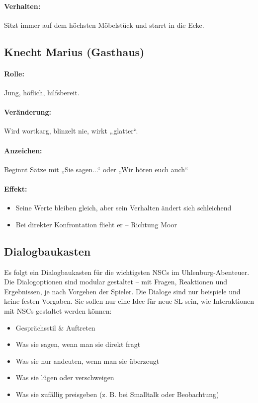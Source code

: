 \paragraph{Verhalten:} Sitzt immer auf dem höchsten Möbelstück und starrt in die Ecke.

\newpage
\subsection{Knecht Marius (Gasthaus)}
\paragraph{Rolle:} Jung, höflich, hilfsbereit.
\paragraph{Veränderung:} Wird wortkarg, blinzelt nie, wirkt „glatter“.
\paragraph{Anzeichen:} Beginnt Sätze mit „Sie sagen...“ oder „Wir hören euch auch“
\paragraph{Effekt:}
\begin{itemize}
\item Seine Werte bleiben gleich, aber sein Verhalten ändert sich schleichend
\item Bei direkter Konfrontation flieht er – Richtung Moor
\end{itemize}

\newpage
\subsection{Dialogbaukasten}
Es folgt ein Dialogbaukasten für die wichtigsten NSCs im Uhlenburg-Abenteuer. Die Dialogoptionen sind modular gestaltet – mit Fragen, Reaktionen und Ergebnissen, je nach Vorgehen der Spieler. Die Dialoge sind nur beispiele und keine festen Vorgaben. Sie sollen nur eine Idee für neue SL sein, wie Interaktionen mit NSCs gestaltet werden können:
\begin{itemize}
\item Gesprächsstil \& Auftreten
\item Was sie sagen, wenn man sie direkt fragt
\item Was sie nur andeuten, wenn man sie überzeugt
\item Was sie lügen oder verschweigen
\item Was sie zufällig preisgeben (z. B. bei Smalltalk oder Beobachtung)
\end{itemize}
